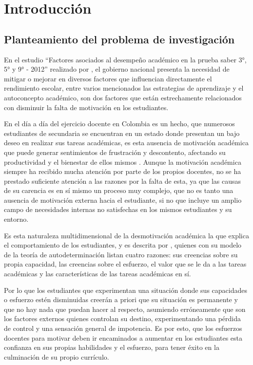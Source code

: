 %
\section{Introducción}

\subsection{Planteamiento del problema de investigación}	

En el estudio ``Factores asociados al desempeño académico en la  prueba saber 3°, 5° y 9° - 2012'' realizado 
por , el gobierno nacional presenta la necesidad de mitigar o mejorar en diversos factores 
que influencian directamente el rendimiento escolar, entre varios mencionados las estrategias de aprendizaje y 
el autoconcepto académico, son dos factores que están estrechamente relacionados con disminuir la falta de 
motivación en los estudiantes.

En el día a día del ejercicio docente en Colombia es un hecho, que numerosos estudiantes de secundaria se 
encuentran en un estado donde presentan un bajo deseo en realizar sus tareas académicas, es esta ausencia de 
motivación académica que puede generar sentimientos de frustración y descontento, afectando su productividad y 
el bienestar de ellos mismos \cite{Legault2006-af}. Aunque la motivación académica siempre ha recibido mucha 
atención por parte de los propios docentes, no se ha prestado suficiente atención a las razones por la falta 
de esta, ya que las causas de su carencia es en sí mismo un proceso muy complejo, que no es tanto una ausencia 
de motivación externa hacia el estudiante, si no que incluye un amplio campo de necesidades internas no 
satisfechas en los mismos estudiantes y su entorno.

Es esta naturaleza multidimensional de la desmotivación académica la que explica el comportamiento de los 
estudiantes, y es descrita por , quienes con su modelo de la teoría de 
autodeterminación listan cuatro razones: sus creencias sobre su propia capacidad, las creencias sobre el 
esfuerzo, el valor que se le da a las tareas académicas y las características de las tareas académicas en sí. 

Por lo que los estudiantes que experimentan una situación donde sus capacidades o esfuerzo estén disminuidas
creerán a priori que su situación es permanente y que no hay nada que puedan hacer al respecto, asumiendo 
erróneamente que son los factores externos quienes controlan su destino, experimentando una pérdida de control 
y una sensación general de impotencia. Es por esto, que los esfuerzos docentes para motivar deben ir 
encaminados a aumentar en los estudiantes esta confianza en sus propias habilidades y el esfuerzo, para tener 
éxito en la culminación de su propio currículo.


